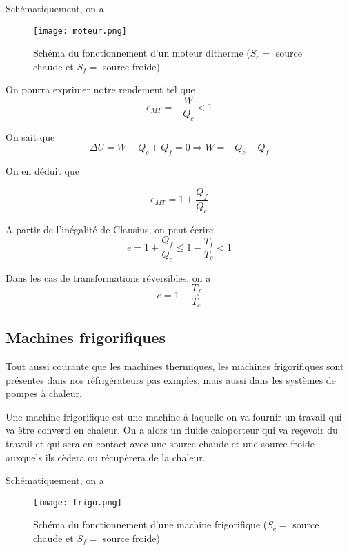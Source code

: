 Schématiquement, on a 
\begin{figure}[H]
\centering
\texttt{[image: moteur.png]}
\caption{Schéma du fonctionnement d'un moteur ditherme ($S_c =$ source chaude et $S_f=$ source froide)}
\end{figure}

\begin{proposition}
On pourra exprimer notre rendement tel que 
\begin{equation}
e_{MT}=-\frac{W}{Q_c} <1
\end{equation}
\end{proposition}

On sait que 
$$\Delta U = W + Q_c+Q_f = 0 \Rightarrow W = -Q_c-Q_f$$

On en déduit que

$$e_{MT}=1+\frac{Q_f}{Q_c}$$

A partir de l'inégalité de Clausius, on peut écrire
$$e= 1 + \frac{Q_f}{Q_c} \leq 1-\frac{T_f}{T_c} <1$$

\begin{proposition}
Dans les cas de transformations réversibles, on a
\begin{equation}
e=1-\frac{T_f}{T_c}
\end{equation}
\end{proposition}

\subsection{Machines frigorifiques}

Tout aussi courante que les machines thermiques, les machines frigorifiques sont présentes dans nos réfrigérateurs pas exmples, mais aussi dans les systèmes de pompes à chaleur.\\

\begin{definition}

Une machine frigorifique est une machine à laquelle on va fournir un travail qui va être converti en chaleur. On a alors un fluide caloporteur qui va reçevoir du travail et qui sera en contact avec une source chaude et une source froide auxquels ils cèdera ou récupèrera de la chaleur.
\end{definition}

 Schématiquement, on a 

\begin{figure}[H]
\centering
\texttt{[image: frigo.png]}
\caption{Schéma du fonctionnement d'une machine frigorifique ($S_c =$ source chaude et $S_f=$ source froide)}
\end{figure}

